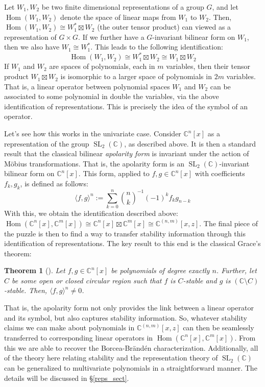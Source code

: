\documentclass{article}
\newtheorem*{ref_theorem}{Theorem}
\theoremstyle{definition}
\theoremstyle{plain}
\newcommand{\C}{\mathbb{C}}
\DeclareMathOperator{\Hom}{Hom}
\DeclareMathOperator{\SL}{SL}
\begin{document}
Let $W_1,W_2$ be two finite dimensional representations of a group $G$, and let $\Hom(W_1,W_2)$ denote the space of linear maps from $W_1$ to $W_2$. Then, $\Hom(W_1,W_2) \cong W_1^* \boxtimes W_2$ (the outer tensor product) can viewed as a representation of $G \times G$. If we further have a $G$-invariant bilinear form on $W_1$, then we also have $W_1 \cong W_1^*$. This leads to the following identification:
\[
    \Hom(W_1,W_2) \cong W_1^* \boxtimes W_2 \cong W_1 \boxtimes W_2
\]
If $W_1$ and $W_2$ are spaces of polynomials, each in $m$ variables, then their tensor product $W_1 \boxtimes W_2$ is isomorphic to a larger space of polynomials in $2m$ variables. That is, a linear operator between polynomial spaces $W_1$ and $W_2$ can be associated to some polynomial in double the variables, via the above identification of representations. This is precisely the idea of the symbol of an operator.

Let's see how this works in the univariate case. Consider $\C^n[x]$ as a representation of the group $\SL_2(\C)$, as described above. It is then a standard result that the classical bilinear \emph{apolarity form} is invariant under the action of M{\"o}bius transformations. That is, the apolarity form is an $\SL_2(\C)$-invariant bilinear form on $\C^n[x]$. This form, applied to $f,g \in \C^n[x]$ with coefficients $f_k,g_k$, is defined as follows:
\[
    \langle f,g \rangle^n := \sum_{k=0}^n \binom{n}{k}^{-1} (-1)^k f_k g_{n-k}
\]
With this, we obtain the identification described above: $\Hom(\C^n[x],\C^m[x]) \cong \C^n[x] \boxtimes \C^m[x] \cong \C^{(n,m)}[x,z]$. The final piece of the puzzle is then to find a way to transfer stability information through this identification of representations. The key result to this end is the classical Grace's theorem:

\begin{ref_theorem}[\cite{grace1902zeros}]
    Let $f,g \in \C^n[x]$ be polynomials of degree exactly $n$. Further, let $C$ be some open or closed circular region such that $f$ is $C$-stable and $g$ is $(\C \setminus C)$-stable. Then, $\langle f,g \rangle^n \neq 0$.
\end{ref_theorem}

That is, the apolarity form not only provides the link between a linear operator and its symbol, but also captures stability information. So, whatever stability claims we can make about polynomials in $\C^{(n,m)}[x,z]$ can then be seamlessly transferred to corresponding linear operators in $\Hom(\C^n[x],\C^m[x])$. From this we are able to recover the Borcea-Br{\"a}nd{\'e}n characterization. Additionally, all of the theory here relating stability and the representation theory of $\SL_2(\C)$ can be generalized to multivariate polynomials in a straightforward manner. The details will be discussed in \S\ref{reps_sect}.
\end{document}
